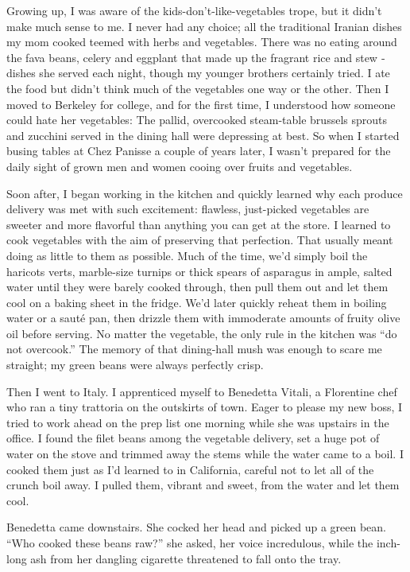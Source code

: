 Growing up, I was aware of the kids-don't-like-vegetables trope, but it
didn't make much sense to me. I never had any choice; all the
traditional Iranian dishes my mom cooked teemed with herbs and
vegetables. There was no eating around the fava beans, celery and
eggplant that made up the fragrant rice and stew ­dishes she served each
night, though my younger brothers certainly tried. I ate the food but
didn't think much of the vegetables one way or the other. Then I moved
to Berkeley for college, and for the first time, I understood how
someone could hate her vegetables: The pallid, overcooked steam-table
brussels sprouts and zucchini served in the dining hall were depressing
at best. So when I started busing tables at Chez Panisse a couple of
years later, I wasn't prepared for the daily sight of grown men and
women cooing over fruits and vegetables.

Soon after, I began working in the kitchen and quickly learned why each
produce delivery was met with such excitement: flawless, just-picked
vegetables are sweeter and more flavorful than anything you can get at
the store. I learned to cook vegetables with the aim of preserving that
perfection. That usually meant doing as little to them as possible. Much
of the time, we'd simply boil the haricots verts, marble-size turnips or
thick spears of asparagus in ample, salted water until they were barely
cooked through, then pull them out and let them cool on a baking sheet
in the fridge. We'd later quickly reheat them in boiling water or a
sauté pan, then drizzle them with immoderate amounts of fruity olive oil
before serving. No matter the vegetable, the only rule in the kitchen
was ``do not overcook.'' The memory of that dining-hall mush was enough
to scare me straight; my green beans were always perfectly crisp.

Then I went to Italy. I apprenticed myself to Benedetta Vitali, a
Florentine chef who ran a tiny trattoria on the outskirts of town. Eager
to please my new boss, I tried to work ahead on the prep list one
morning while she was upstairs in the office. I found the filet beans
among the vegetable delivery, set a huge pot of water on the stove and
trimmed away the stems while the water came to a boil. I cooked them
just as I'd learned to in California, careful not to let all of the
crunch boil away. I pulled them, vibrant and sweet, from the water and
let them cool.

Benedetta came downstairs. She cocked her head and picked up a green
bean. ``Who cooked these beans raw?'' she asked, her voice incredulous,
while the inch-long ash from her dangling cigarette threatened to fall
onto the tray.

